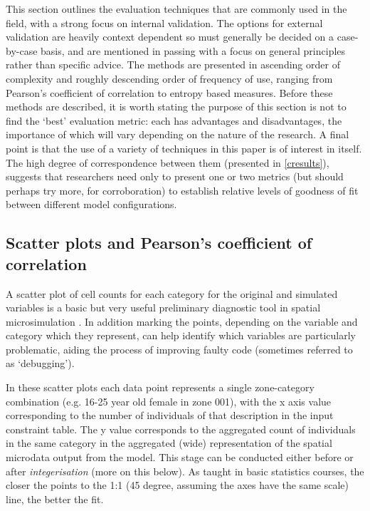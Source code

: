 \documentclass[a4paper,10pt]{article}
\begin{document}
This section outlines the evaluation techniques that are commonly used in the
field, with a strong focus on internal validation. The options for external
validation are heavily context dependent so must generally be decided on a
case-by-case basis, and are mentioned in passing with a focus on general principles
rather than specific advice. The methods are presented in ascending order of complexity
and roughly descending order of frequency of use, ranging from Pearson's coefficient of
correlation to entropy based measures. Before these methods are described, it is
worth stating the purpose of this section is not to find the `best' evaluation metric:
each has advantages and disadvantages, the importance of which will vary depending on the
nature of the research. A final point is that the use of a variety of techniques in this paper
is of interest in itself. The high degree of correspondence between them (presented in \cref{cresults}),
suggests that researchers need only to present one or two metrics (but should
perhaps try more, for corroboration) to establish relative levels of goodness of fit between
different model configurations.

\subsection{Scatter plots and Pearson's coefficient of correlation}
A scatter plot of cell counts for each category for the original and simulated variables is
a basic but very useful preliminary diagnostic tool in spatial microsimulation
\citep{Ballas2005c,Edwards2009}.
In addition marking the points, depending on the
variable and category %
which they represent, can help identify which variables are particularly problematic,
aiding the process of improving faulty code (sometimes referred to as `debugging').

In these scatter plots each data point represents a single zone-category
combination (e.g. 16-25 year old female in zone 001), with the x axis value corresponding
to the number of individuals of that description in the input constraint table.
The y value corresponds to the
aggregated count of individuals in the same category in the aggregated
(wide) representation of the spatial microdata output from the model. %
This stage can be conducted either before or after \emph{integerisation}
(more on this below). As taught in basic statistics courses, the closer the points to the
1:1 (45 degree, assuming the axes have the same scale) line, the better the fit.
\end{document}
